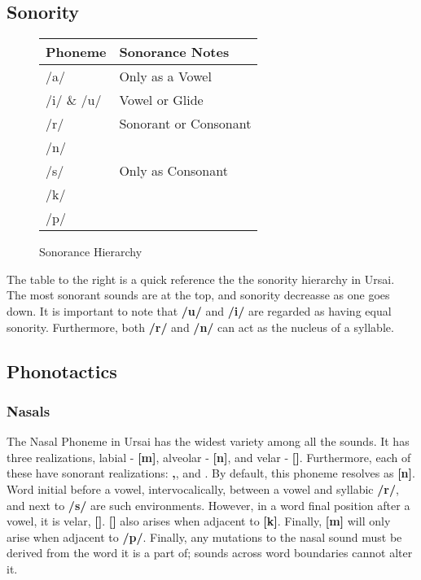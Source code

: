 \documentclass[11pt,letterpaper]{article}
\newcommand{\engma}{\textipa{N}}
\begin{document}
	\subsection{Sonority}\label{sonority}
		\begin{wrapfigure}{r}{0.4\textwidth}
  			\begin{tabular}{|l|l|}
  				\hline
  				Phoneme    & Sonorance Notes \\ \hline \hline
  				/a/        & Only as a Vowel \\ \hline
  				/i/ \& /u/ & Vowel or Glide  \\ \hline
  				/r/        & Sonorant or Consonant\\ 
  				/n/        &                 \\ \hline
  				/s/        & Only as Consonant\\
  				/k/        &  \\
  				/p/        &  \\ \hline
  			\end{tabular}
  			\caption{Sonorance Hierarchy}
		\end{wrapfigure}
		\par
		The table to the right is a quick reference the the sonority hierarchy in Ursai.  The most sonorant sounds are at the top, and sonority decreasse as one goes down.  It is important to note that \textbf{/u/} and \textbf{/i/} are regarded as having equal sonority.  Furthermore, both \textbf{/r/} and \textbf{/n/} can act as the nucleus of a syllable.
		\par
		
	\subsection{Phonotactics}
		\subsubsection{Nasals}\label{nasal}
		\par
		The Nasal Phoneme in Ursai has the widest variety among all the sounds.  It has three realizations, labial - \textbf{[m]}, alveolar - \textbf{[n]}, and velar - \textbf{[\engma]}.  Furthermore, each of these have sonorant realizations: \textbf{\mson ,\space\nson}, and \textbf{\engson}.  By default, this phoneme resolves as \textbf{[n]}.  Word initial before a vowel, intervocalically, between a vowel and syllabic \textbf{/r/}, and next to \textbf{/s/} are such environments.  However, in a word final position after a vowel, it is velar, \textbf{[\engma]}.  \textbf{[\engma]} also arises when adjacent to \textbf{[k]}.  Finally, \textbf{[m]} will only arise when adjacent to \textbf{/p/}.  Finally, any mutations to the nasal sound must be derived from the word it is a part of; sounds across word boundaries cannot alter it.
\end{document}
